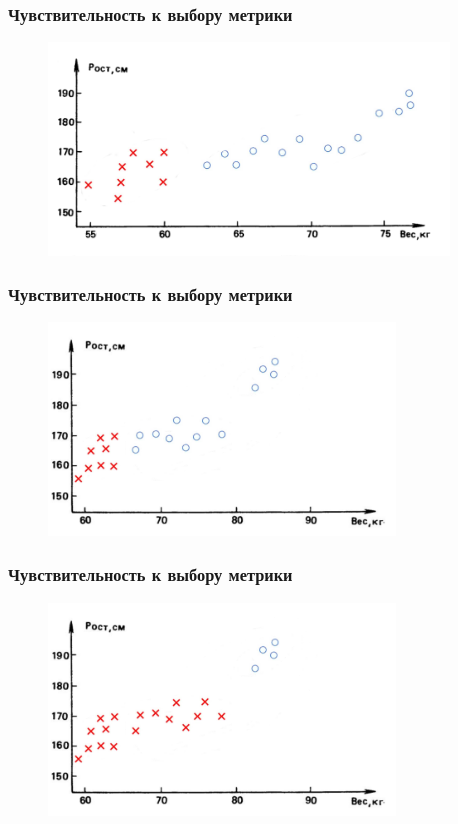\documentclass[12pt]{beamer}
\begin{document}
\begin{frame}\frametitle{Чувствительность к выбору метрики}
\begin{figure}[htbp]
  \includegraphics[height=160pt, keepaspectratio = true]{images/students}  
\end{figure}
\end{frame}

\begin{frame}\frametitle{Чувствительность к выбору метрики}
\begin{figure}[htbp]
  \includegraphics[height=160pt, keepaspectratio = true]{images/students1}  
\end{figure}
\end{frame}

\begin{frame}\frametitle{Чувствительность к выбору метрики}
\begin{figure}[htbp]
  \includegraphics[height=160pt, keepaspectratio = true]{images/students2}  
\end{figure}
\end{frame}
\end{document}
